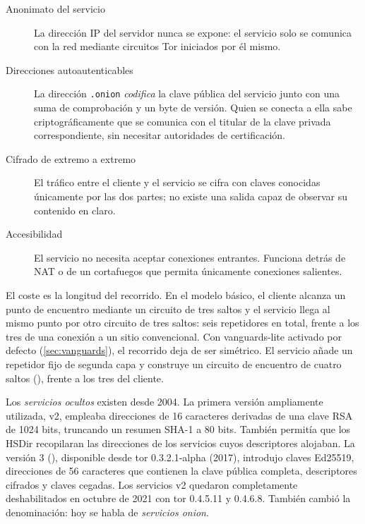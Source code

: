 \begin{description}
  \item[Anonimato del servicio] La dirección IP del servidor nunca se expone: el servicio solo se comunica con la red mediante circuitos Tor iniciados por él mismo.
  \item[Direcciones autoautenticables] La dirección \texttt{.onion} \emph{codifica} la clave pública del servicio junto con una suma de comprobación y un byte de versión. Quien se conecta a ella sabe criptográficamente que se comunica con el titular de la clave privada correspondiente, sin necesitar autoridades de certificación.
  \item[Cifrado de extremo a extremo] El tráfico entre el cliente y el servicio se cifra con claves conocidas únicamente por las dos partes; no existe una salida capaz de observar su contenido en claro.
  \item[Accesibilidad] El servicio no necesita aceptar conexiones entrantes. Funciona detrás de NAT o de un cortafuegos que permita únicamente conexiones salientes.
\end{description}

El coste es la longitud del recorrido. En el modelo básico, el cliente alcanza un punto de encuentro mediante un circuito de tres saltos y el servicio llega al mismo punto por otro circuito de tres saltos: seis repetidores en total, frente a los tres de una conexión a un sitio convencional. Con vanguards-lite activado por defecto (\cref{sec:vanguards}), el recorrido deja de ser simétrico. El servicio añade un repetidor fijo de segunda capa y construye un circuito de encuentro de cuatro saltos (), frente a los tres del cliente.

\begin{storia}[De v2 a v3]
Los \emph{servicios ocultos} existen desde 2004. La primera versión ampliamente utilizada, v2, empleaba direcciones de 16 caracteres derivadas de una clave RSA de 1024 bits, truncando un resumen SHA-1 a 80 bits. También permitía que los HSDir recopilaran las direcciones de los servicios cuyos descriptores alojaban. La versión 3 (), disponible desde tor 0.3.2.1-alpha (2017), introdujo claves Ed25519, direcciones de 56 caracteres que contienen la clave pública completa, descriptores cifrados y claves cegadas. Los servicios v2 quedaron completamente deshabilitados en octubre de 2021 con tor 0.4.5.11 y 0.4.6.8. También cambió la denominación: hoy se habla de \emph{servicios onion}.
\end{storia}

